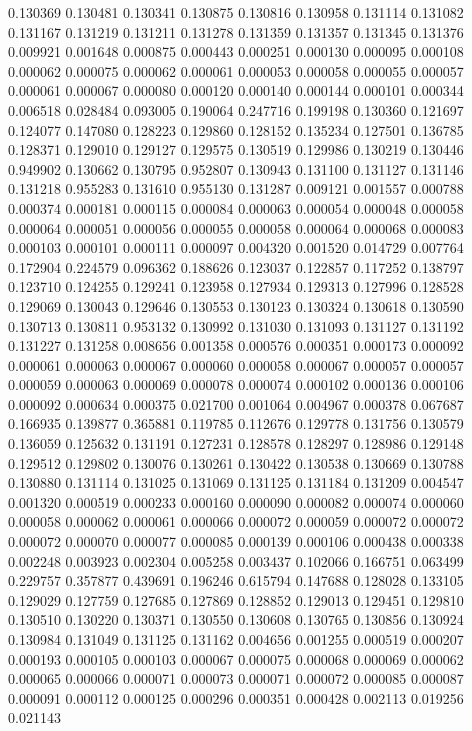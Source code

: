 0.130369
0.130481
0.130341
0.130875
0.130816
0.130958
0.131114
0.131082
0.131167
0.131219
0.131211
0.131278
0.131359
0.131357
0.131345
0.131376
0.009921
0.001648
0.000875
0.000443
0.000251
0.000130
0.000095
0.000108
0.000062
0.000075
0.000062
0.000061
0.000053
0.000058
0.000055
0.000057
0.000061
0.000067
0.000080
0.000120
0.000140
0.000144
0.000101
0.000344
0.006518
0.028484
0.093005
0.190064
0.247716
0.199198
0.130360
0.121697
0.124077
0.147080
0.128223
0.129860
0.128152
0.135234
0.127501
0.136785
0.128371
0.129010
0.129127
0.129575
0.130519
0.129986
0.130219
0.130446
0.949902
0.130662
0.130795
0.952807
0.130943
0.131100
0.131127
0.131146
0.131218
0.955283
0.131610
0.955130
0.131287
0.009121
0.001557
0.000788
0.000374
0.000181
0.000115
0.000084
0.000063
0.000054
0.000048
0.000058
0.000064
0.000051
0.000056
0.000055
0.000058
0.000064
0.000068
0.000083
0.000103
0.000101
0.000111
0.000097
0.004320
0.001520
0.014729
0.007764
0.172904
0.224579
0.096362
0.188626
0.123037
0.122857
0.117252
0.138797
0.123710
0.124255
0.129241
0.123958
0.127934
0.129313
0.127996
0.128528
0.129069
0.130043
0.129646
0.130553
0.130123
0.130324
0.130618
0.130590
0.130713
0.130811
0.953132
0.130992
0.131030
0.131093
0.131127
0.131192
0.131227
0.131258
0.008656
0.001358
0.000576
0.000351
0.000173
0.000092
0.000061
0.000063
0.000067
0.000060
0.000058
0.000067
0.000057
0.000057
0.000059
0.000063
0.000069
0.000078
0.000074
0.000102
0.000136
0.000106
0.000092
0.000634
0.000375
0.021700
0.001064
0.004967
0.000378
0.067687
0.166935
0.139877
0.365881
0.119785
0.112676
0.129778
0.131756
0.130579
0.136059
0.125632
0.131191
0.127231
0.128578
0.128297
0.128986
0.129148
0.129512
0.129802
0.130076
0.130261
0.130422
0.130538
0.130669
0.130788
0.130880
0.131114
0.131025
0.131069
0.131125
0.131184
0.131209
0.004547
0.001320
0.000519
0.000233
0.000160
0.000090
0.000082
0.000074
0.000060
0.000058
0.000062
0.000061
0.000066
0.000072
0.000059
0.000072
0.000072
0.000072
0.000070
0.000077
0.000085
0.000139
0.000106
0.000438
0.000338
0.002248
0.003923
0.002304
0.005258
0.003437
0.102066
0.166751
0.063499
0.229757
0.357877
0.439691
0.196246
0.615794
0.147688
0.128028
0.133105
0.129029
0.127759
0.127685
0.127869
0.128852
0.129013
0.129451
0.129810
0.130510
0.130220
0.130371
0.130550
0.130608
0.130765
0.130856
0.130924
0.130984
0.131049
0.131125
0.131162
0.004656
0.001255
0.000519
0.000207
0.000193
0.000105
0.000103
0.000067
0.000075
0.000068
0.000069
0.000062
0.000065
0.000066
0.000071
0.000073
0.000071
0.000072
0.000085
0.000087
0.000091
0.000112
0.000125
0.000296
0.000351
0.000428
0.002113
0.019256
0.021143
